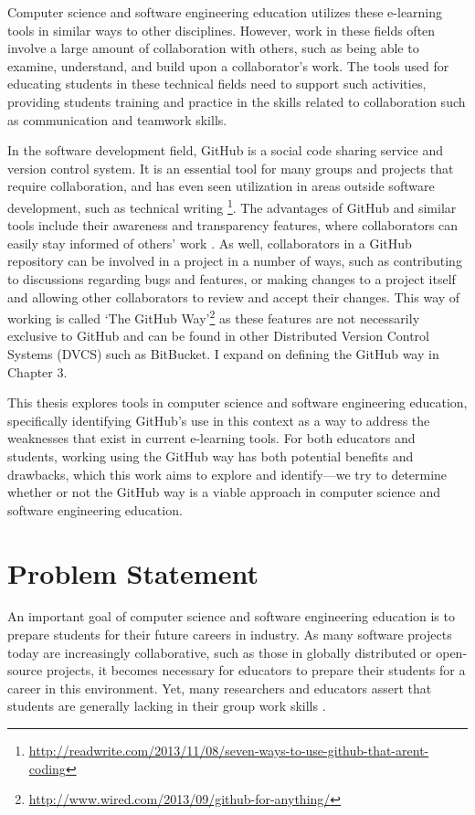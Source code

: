 Computer science and software engineering education utilizes these e-learning tools in similar ways to other disciplines. However, work in these fields often involve a large amount of collaboration with others, such as being able to examine, understand, and build upon a collaborator's work. The tools used for educating students in these technical fields need to support such activities, providing students training and practice in the skills related to collaboration such as communication and teamwork skills.

In the software development field, GitHub is a social code sharing service and version control system. It is an essential tool for many groups and projects that require collaboration, and has even seen utilization in areas outside software development, such as technical writing \footnote{\url{http://readwrite.com/2013/11/08/seven-ways-to-use-github-that-arent-coding}}. The advantages of GitHub and similar tools include their awareness and transparency features, where collaborators can easily stay informed of others' work \cite{dabbish2012social}. As well, collaborators in a GitHub repository can be involved in a project in a number of ways, such as contributing to discussions regarding bugs and features, or making changes to a project itself and allowing other collaborators to review and accept their changes. This way of working is called `The GitHub Way'\footnote{\url{http://www.wired.com/2013/09/github-for-anything/}} as these features are not necessarily exclusive to GitHub and can be found in other Distributed Version Control Systems (DVCS) such as BitBucket. I expand on defining the GitHub way in Chapter 3.

This thesis explores tools in computer science and software engineering education, specifically identifying GitHub's use in this context as a way to address the weaknesses that exist in current e-learning tools. For both educators and students, working using the GitHub way has both potential benefits and drawbacks, which this work aims to explore and identify---we try to determine whether or not the GitHub way is a viable approach in computer science and software engineering education.

\section{Problem Statement}
An important goal of computer science and software engineering education is to prepare students for their future careers in industry. As many software projects today are increasingly collaborative, such as those in globally distributed or open-source projects, it becomes necessary for educators to prepare their students for a career in this environment. Yet, many researchers and educators assert that students are generally lacking in their group work skills \cite{waite2004student}.

